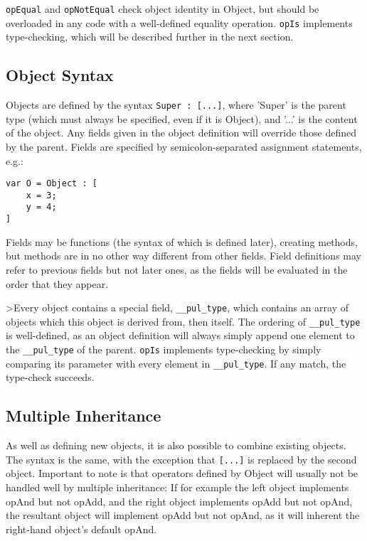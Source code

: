 \texttt{opEqual} and \texttt{opNotEqual} check object identity in Object, but should be overloaded in any code with a well-defined equality operation. \texttt{opIs} implements type-checking, which will be described further in the next section.



\subsection{Object Syntax}

Objects are defined by the syntax \texttt{Super : [...]}, where 'Super' is the parent type (which must always be specified, even if it is Object), and '...' is the content of the object. Any fields given in the object definition will override those defined by the parent. Fields are specified by semicolon-separated assignment statements, e.g.:

\begin{verbatim}
var O = Object : [
    x = 3;
    y = 4;
]
\end{verbatim}



Fields may be functions (the syntax of which is defined later), creating methods, but methods are in no other way different from other fields. Field definitions may refer to previous fields but not later ones, as the fields will be evaluated in the order that they appear.

>Every object contains a special field, \texttt{\_\_pul\_type}, which contains an array of objects which this object is derived from, then itself. The ordering of \texttt{\_\_pul\_type} is well-defined, as an object definition will always simply append one element to the \texttt{\_\_pul\_type} of the parent. \texttt{opIs} implements type-checking by simply comparing its parameter with every element in \texttt{\_\_pul\_type}. If any match, the type-check succeeds.



\subsection{Multiple Inheritance}

As well as defining new objects, it is also possible to combine existing objects. The syntax is the same, with the exception that \texttt{[...]} is replaced by the second object. Important to note is that operators defined by Object will usually not be handled well by multiple inheritance: If for example the left object implements opAnd but not opAdd, and the right object implements opAdd but not opAnd, the resultant object will implement opAdd but not opAnd, as it will inherent the right-hand object's default opAnd.



